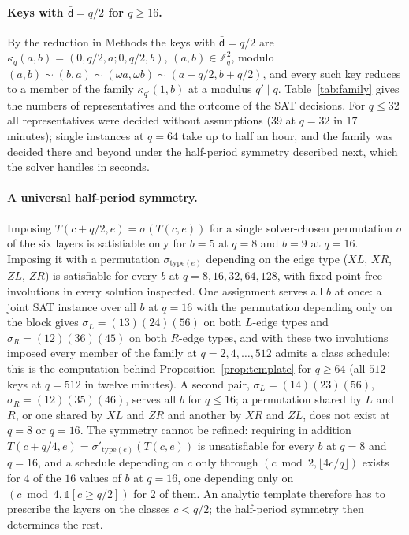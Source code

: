 \documentclass[reprint,twocolumn,superscriptaddress,nofootinbib]{revtex4-2}
\theoremstyle{plain}
\newcommand{\Zq}{\mathbb{Z}_q}
\newcommand{\colbar}{\bar{\mathsf{d}}} %
\begin{document}
\paragraph*{Keys with $\colbar=q/2$ for $q\ge16$.}
By the reduction in Methods the keys with $\colbar=q/2$ are
$\kappa_q(a,b)=(0,q/2,a;0,q/2,b)$, $(a,b)\in\Zq^2$, modulo
$(a,b)\sim(b,a)\sim(\omega a,\omega b)\sim(a+q/2,b+q/2)$, and every such
key reduces to a member of the family $\kappa_{q'}(1,b)$ at a modulus
$q'\mid q$. Table~\ref{tab:family} gives the numbers of representatives
and the outcome of the SAT decisions. For $q\le32$ all representatives
were decided without assumptions ($39$ at $q=32$ in $17$ minutes); single
instances at $q=64$ take up to half an hour, and the family was decided
there and beyond under the half-period symmetry described next, which the
solver handles in seconds.

\paragraph*{A universal half-period symmetry.}
Imposing $T(c+q/2,e)=\sigma(T(c,e))$ for a single solver-chosen
permutation $\sigma$ of the six layers is satisfiable only for $b=5$ at
$q=8$ and $b=9$ at $q=16$. Imposing it with a permutation
$\sigma_{\mathrm{type}(e)}$ depending on the edge type ($XL$, $XR$, $ZL$,
$ZR$) is satisfiable for every $b$ at $q=8,16,32,64,128$, with
fixed-point-free involutions in every solution inspected. One assignment
serves all $b$ at once: a
joint SAT instance over all $b$ at $q=16$ with the permutation depending
only on the block gives $\sigma_L=(13)(24)(56)$ on both $L$-edge types and
$\sigma_R=(12)(36)(45)$ on both $R$-edge types, and with these two
involutions imposed every member of the family at $q=2,4,\dots,512$ admits
a class schedule; this is the computation behind
Proposition~\ref{prop:template} for $q\ge64$ (all $512$ keys at $q=512$ in
twelve minutes). A second pair, $\sigma_L=(14)(23)(56)$,
$\sigma_R=(12)(35)(46)$, serves all $b$ for $q\le16$; a permutation shared
by $L$ and $R$, or one shared by $XL$ and $ZR$ and another by $XR$ and
$ZL$, does not exist at $q=8$ or $q=16$. The symmetry cannot be refined:
requiring in addition $T(c+q/4,e)=\sigma'_{\mathrm{type}(e)}(T(c,e))$ is
unsatisfiable for every $b$ at $q=8$ and $q=16$, and a schedule depending
on $c$ only through $(c\bmod2,\lfloor4c/q\rfloor)$ exists for $4$ of the
$16$ values of $b$ at $q=16$, one depending only on
$(c\bmod4,\mathbb{1}[c\ge q/2])$ for $2$ of them. An analytic template
therefore has to prescribe the layers on the classes $c<q/2$; the
half-period symmetry then determines the rest.
\end{document}
